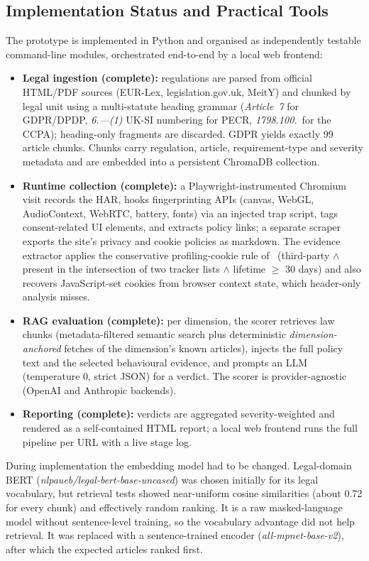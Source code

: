 \documentclass[conference]{IEEEtran}
\begin{document}
\subsection{Implementation Status and Practical Tools}
\label{sec:impl}
The prototype is implemented in Python and organised as independently testable command-line modules, orchestrated end-to-end by a local web frontend:
\begin{itemize}
    \item \textbf{Legal ingestion (complete):} regulations are parsed from official HTML/PDF sources (EUR-Lex, legislation.gov.uk, MeitY) and chunked by legal unit using a multi-statute heading grammar (\textsl{Article~7} for GDPR/DPDP, \textsl{6.---(1)} UK-SI numbering for PECR, \textsl{1798.100.}\ for the CCPA); heading-only fragments are discarded. GDPR yields exactly 99 article chunks. Chunks carry regulation, article, requirement-type and severity metadata and are embedded into a persistent ChromaDB collection.
    \item \textbf{Runtime collection (complete):} a Playwright-instrumented Chromium visit records the HAR, hooks fingerprinting APIs (canvas, WebGL, AudioContext, WebRTC, battery, fonts) via an injected trap script, tags consent-related UI elements, and extracts policy links; a separate scraper exports the site's privacy and cookie policies as markdown. The evidence extractor applies the conservative profiling-cookie rule of~\cite{trevisan-2019-cookielaw} (third-party $\wedge$ present in the intersection of two tracker lists $\wedge$ lifetime $\geq$ 30 days) and also recovers JavaScript-set cookies from browser context state, which header-only analysis misses.
    \item \textbf{RAG evaluation (complete):} per dimension, the scorer retrieves law chunks (metadata-filtered semantic search plus deterministic \emph{dimension-anchored} fetches of the dimension's known articles), injects the full policy text and the selected behavioural evidence, and prompts an LLM (temperature 0, strict JSON) for a verdict. The scorer is provider-agnostic (OpenAI and Anthropic backends).
    \item \textbf{Reporting (complete):} verdicts are aggregated severity-weighted and rendered as a self-contained HTML report; a local web frontend runs the full pipeline per URL with a live stage log.
\end{itemize}
During implementation the embedding model had to be changed. Legal-domain BERT (\textsl{nlpaueb/legal-bert-base-uncased}) was chosen initially for its legal vocabulary, but retrieval tests showed near-uniform cosine similarities (about 0.72 for every chunk) and effectively random ranking. It is a raw masked-language model without sentence-level training, so the vocabulary advantage did not help retrieval. It was replaced with a sentence-trained encoder (\textsl{all-mpnet-base-v2}), after which the expected articles ranked first.
\end{document}
